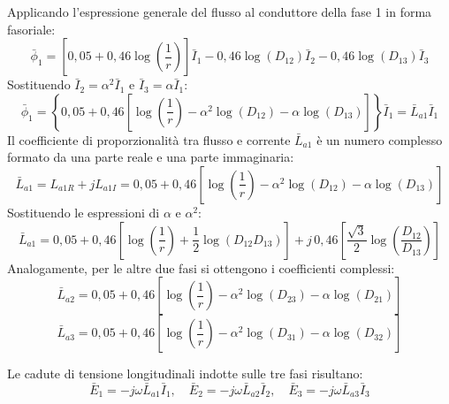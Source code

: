 Applicando l'espressione generale del flusso al conduttore della fase 1 in forma fasoriale:
\[\bar{\phi}_1 = \left[0{,}05 + 0{,}46 \log\left(\frac{1}{r}\right)\right] \bar{I}_1 - 0{,}46 \log(D_{12}) \bar{I}_2 - 0{,}46 \log(D_{13}) \bar{I}_3\]
Sostituendo $\bar{I}_2 = \alpha^2 \bar{I}_1$ e $\bar{I}_3 = \alpha \bar{I}_1$:
\[\bar{\phi}_1 = \left\{0{,}05 + 0{,}46 \left[\log\left(\frac{1}{r}\right) - \alpha^2 \log(D_{12}) - \alpha \log(D_{13})\right]\right\} \bar{I}_1 = \bar{L}_{a1} \bar{I}_1\]
Il coefficiente di proporzionalità tra flusso e corrente $\bar{L}_{a1}$ è un numero complesso formato da una parte reale e una parte immaginaria:
\[\bar{L}_{a1} = L_{a1R} + j L_{a1I} = 0{,}05 + 0{,}46 \left[\log\left(\frac{1}{r}\right) - \alpha^2 \log(D_{12}) - \alpha \log(D_{13})\right]\]
Sostituendo le espressioni di $\alpha$ e $\alpha^2$:
\[\bar{L}_{a1} = 0{,}05 + 0{,}46 \left[\log\left(\frac{1}{r}\right) + \frac{1}{2}\log(D_{12} D_{13})\right] + j \, 0{,}46 \left[\frac{\sqrt{3}}{2}\log\left(\frac{D_{12}}{D_{13}}\right)\right]\]
Analogamente, per le altre due fasi si ottengono i coefficienti complessi:
\[\bar{L}_{a2} = 0{,}05 + 0{,}46 \left[\log\left(\frac{1}{r}\right) - \alpha^2 \log(D_{23}) - \alpha \log(D_{21})\right]\]
\[\bar{L}_{a3} = 0{,}05 + 0{,}46 \left[\log\left(\frac{1}{r}\right) - \alpha^2 \log(D_{31}) - \alpha \log(D_{32})\right]\]

Le cadute di tensione longitudinali indotte sulle tre fasi risultano:
\[\bar{E}_1 = -j \omega \bar{L}_{a1} \bar{I}_1, \quad \bar{E}_2 = -j \omega \bar{L}_{a2} \bar{I}_2, \quad \bar{E}_3 = -j \omega \bar{L}_{a3} \bar{I}_3\]

